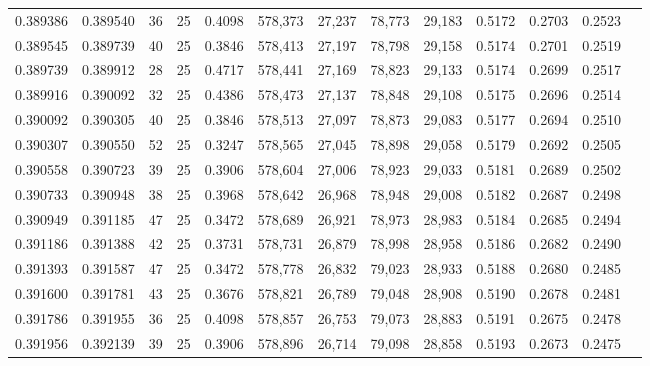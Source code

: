 \begin{tabular}{rrrrrrrrrrrrr}
0.389386 & 0.389540 &    36 &  25 &                                     0.4098 & 578,373 &  27,237 &  78,773 &  29,183 & 0.5172 & 0.2703 & 0.2523 \\
0.389545 & 0.389739 &    40 &  25 &                                     0.3846 & 578,413 &  27,197 &  78,798 &  29,158 & 0.5174 & 0.2701 & 0.2519 \\
0.389739 & 0.389912 &    28 &  25 &                                     0.4717 & 578,441 &  27,169 &  78,823 &  29,133 & 0.5174 & 0.2699 & 0.2517 \\
0.389916 & 0.390092 &    32 &  25 &                                     0.4386 & 578,473 &  27,137 &  78,848 &  29,108 & 0.5175 & 0.2696 & 0.2514 \\
0.390092 & 0.390305 &    40 &  25 &                                     0.3846 & 578,513 &  27,097 &  78,873 &  29,083 & 0.5177 & 0.2694 & 0.2510 \\
0.390307 & 0.390550 &    52 &  25 &                                     0.3247 & 578,565 &  27,045 &  78,898 &  29,058 & 0.5179 & 0.2692 & 0.2505 \\
0.390558 & 0.390723 &    39 &  25 &                                     0.3906 & 578,604 &  27,006 &  78,923 &  29,033 & 0.5181 & 0.2689 & 0.2502 \\
0.390733 & 0.390948 &    38 &  25 &                                     0.3968 & 578,642 &  26,968 &  78,948 &  29,008 & 0.5182 & 0.2687 & 0.2498 \\
0.390949 & 0.391185 &    47 &  25 &                                     0.3472 & 578,689 &  26,921 &  78,973 &  28,983 & 0.5184 & 0.2685 & 0.2494 \\
0.391186 & 0.391388 &    42 &  25 &                                     0.3731 & 578,731 &  26,879 &  78,998 &  28,958 & 0.5186 & 0.2682 & 0.2490 \\
0.391393 & 0.391587 &    47 &  25 &                                     0.3472 & 578,778 &  26,832 &  79,023 &  28,933 & 0.5188 & 0.2680 & 0.2485 \\
0.391600 & 0.391781 &    43 &  25 &                                     0.3676 & 578,821 &  26,789 &  79,048 &  28,908 & 0.5190 & 0.2678 & 0.2481 \\
0.391786 & 0.391955 &    36 &  25 &                                     0.4098 & 578,857 &  26,753 &  79,073 &  28,883 & 0.5191 & 0.2675 & 0.2478 \\
0.391956 & 0.392139 &    39 &  25 &                                     0.3906 & 578,896 &  26,714 &  79,098 &  28,858 & 0.5193 & 0.2673 & 0.2475 \\

\end{tabular}
